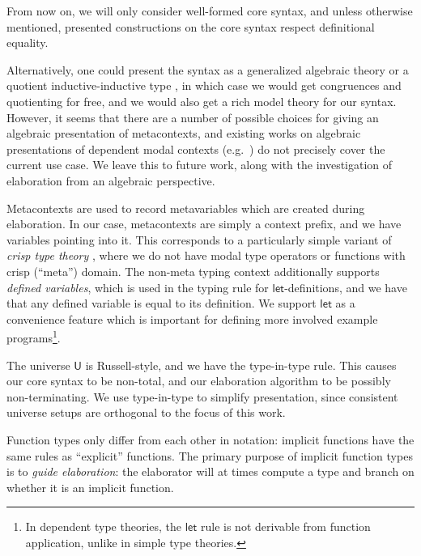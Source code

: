 \documentclass[acmsmall,review,anonymous,prologue,dvipsnames]{acmart}\settopmatter{printfolios=true,printccs=false,printacmref=false}
\newcommand{\slet}{\boldsymbol{\mathsf{let}}}
\renewcommand{\U}{\mathsf{U}}
\theoremstyle{remark}
\begin{document}
From now on, we will only consider well-formed core syntax, and unless otherwise
mentioned, presented constructions on the core syntax respect definitional
equality.

Alternatively, one could present the syntax as a generalized algebraic theory
\cite{sterling2019algebraic} or a quotient inductive-inductive type
\cite{ttintt}, in which case we would get congruences and quotienting for free,
and we would also get a rich model theory for our syntax. However, it seems that
there are a number of possible choices for giving an algebraic presentation of
metacontexts, and existing works on algebraic presentations of dependent modal
contexts (e.g.\ \cite{birkedal2018modal}) do not precisely cover the current use
case. We leave this to future work, along with the investigation of elaboration
from an algebraic perspective.

Metacontexts are used to record metavariables which are created during
elaboration. In our case, metacontexts are simply a context prefix, and we have
variables pointing into it. This corresponds to a particularly simple variant of
\emph{crisp type theory} \cite{licata2018internal}, where we do not have modal
type operators or functions with crisp (``meta'') domain. The non-meta typing
context additionally supports \emph{defined variables}, which is used in the
typing rule for $\slet$-definitions, and we have that any defined variable is
equal to its definition. We support $\slet$ as a convenience feature which
is important for defining more involved example programs\footnote{In dependent type theories, the $\slet$ rule is not
  derivable from function application, unlike in simple type theories.}.

The universe $\U$ is Russell-style, and we have the type-in-type rule.
This causes our core syntax to be non-total, and our elaboration algorithm to be
possibly non-terminating. We use type-in-type to simplify presentation, since
consistent universe setups are orthogonal to the focus of this work.

Function types only differ from each other in notation: implicit
functions have the same rules as ``explicit'' functions. The primary purpose of
implicit function types is to \emph{guide elaboration}: the elaborator will at
times compute a type and branch on whether it is an implicit function.
\end{document}
